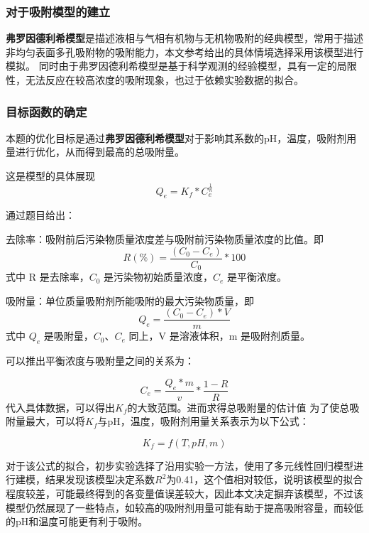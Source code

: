 \documentclass[AutoFakeBold]{ctexart}
\begin{document}
	\subsubsection{对于吸附模型的建立}
	\songti{}\textbf{弗罗因德利希模型}是描述液相与气相有机物与无机物吸附的经典模型，常用于描述非均匀表面多孔吸附物的吸附能力，本文参考给出的具体情境选择采用该模型进行模拟。\cite{kano2000fractal}
	\songti{}同时由于弗罗因德利希模型是基于科学观测的经验模型，具有一定的局限性，无法反应在较高浓度的吸附现象，也过于依赖实验数据的拟合。
	\subsubsection{目标函数的确定}
	\songti{}本题的优化目标是通过\textbf{弗罗因德利希模型}对于影响其系数的pH，温度，吸附剂用量进行优化，从而得到最高的总吸附量。
	
	这是模型的具体展现
	\begin{equation}
		Q_e = K_f*C_e^{\frac{1}{n}}
		\label{eq:eq1}
	\end{equation}
	
	通过题目给出：
	
	去除率：吸附前后污染物质量浓度差与吸附前污染物质量浓度的比值。即
	\begin{equation}
		R(\%) = \frac{(C_0-C_e)}{C_0}*100
		\label{eq:eq2}
	\end{equation}
	式中 R 是去除率，$C_0$ 是污染物初始质量浓度，$C_e$ 是平衡浓度。
	
	吸附量：单位质量吸附剂所能吸附的最大污染物质量，即
	\begin{equation}
		Q_e = \frac{(C_0-C_e)*V}{m}
		\label{eq:eq3}
	\end{equation}
	式中 $Q_e$ 是吸附量，$C_0$、$C_e$ 同上，V 是溶液体积，m 是吸附剂质量。
	
	可以推出平衡浓度与吸附量之间的关系为：
	
	
	
	
	\begin{equation}
		C_e  =  \frac{Q_e*m}{v}*\frac{1-R}{R}
		\label{eq:eq4}
	\end{equation}
	代入具体数据，可以得出$K_f$的大致范围。进而求得总吸附量的估计值
	为了使总吸附量最大，可以将$K_f$与pH，温度，吸附剂用量关系表示为以下公式：
	
	\begin{equation}
		K_f=f(T,pH,m)
		\label{eq:eq5}
	\end{equation}
	
	对于该公式的拟合，初步实验选择了沿用实验一方法，使用了多元线性回归模型进行建模，结果发现该模型决定系数$R^2$为0.41，这个值相对较低，说明该模型的拟合程度较差，可能最终得到的各变量值误差较大，因此本文决定摒弃该模型，不过该模型仍然展现了一些特点，如较高的吸附剂用量可能有助于提高吸附容量，而较低的pH和温度可能更有利于吸附。
	
\end{document}
